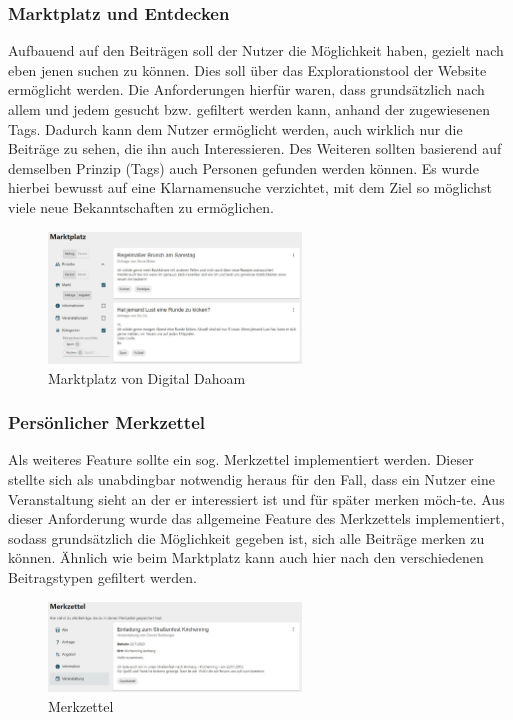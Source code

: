 \subsubsection{Marktplatz und Entdecken}

Aufbauend auf den Beiträgen soll der Nutzer die Möglichkeit haben, gezielt nach eben jenen suchen zu können. Dies soll über das Explorationstool der Website ermöglicht werden.
Die Anforderungen hierfür waren, dass grundsätzlich nach allem und jedem gesucht bzw. gefiltert werden kann, anhand der zugewiesenen Tags. Dadurch kann dem Nutzer ermöglicht werden, auch wirklich nur die Beiträge zu sehen, die ihn auch Interessieren.
Des Weiteren sollten basierend auf demselben Prinzip (Tags) auch Personen gefunden werden können. Es wurde hierbei bewusst auf eine Klarnamensuche verzichtet, mit dem Ziel so möglichst viele neue Bekanntschaften zu ermöglichen. 

\begin{figure}[h!]
    \centering
    \includegraphics[width=0.6\textwidth]{figures/andre/marktplatzvondigitaldahoam.jpg}
    \caption{Marktplatz von Digital Dahoam}
    \label{fig:marktplatzvondigitaldahoam}
\end{figure}

\subsubsection{Persönlicher Merkzettel}
Als weiteres Feature sollte ein sog. Merkzettel implementiert werden. Dieser stellte sich als unabdingbar notwendig heraus für den Fall, dass ein Nutzer eine Veranstaltung sieht an der er interessiert ist und für später merken möch-te.
Aus dieser Anforderung wurde das allgemeine Feature des Merkzettels implementiert, sodass grundsätzlich die Möglichkeit gegeben ist, sich alle Beiträge merken zu können. Ähnlich wie beim Marktplatz kann auch hier nach den verschiedenen Beitragstypen gefiltert werden.

\begin{figure}[ht!]
    \centering
    \includegraphics[width=0.6\textwidth]{figures/andre/merkzettel.jpg}
    \caption{Merkzettel}
    \label{fig:merkzettel}
\end{figure}